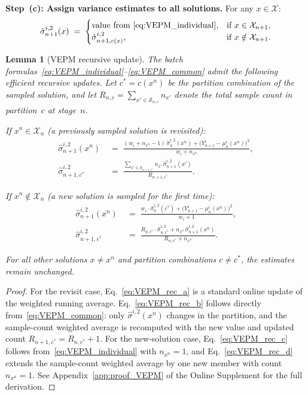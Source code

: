 \documentclass[12pt]{article}
\theoremstyle{plain}
\newtheorem{lemma}{Lemma}[section]
\theoremstyle{definition}
\theoremstyle{remark}
\begin{document}
\medskip
\noindent\textbf{Step~(c): Assign variance estimates to all solutions.} For any $x \in \mathcal{X}$:
\begin{equation}\label{eq:VEPM_assign}
  \hat{\sigma}^{i,2}_{n+1}(x) \;=\;
  \begin{cases}
    \text{value from \eqref{eq:VEPM_individual}}, & \text{if } x \in \mathcal{X}_{n+1}, \\
    \hat{\sigma}^{i,2}_{n+1,c(x)}, & \text{if } x \notin \mathcal{X}_{n+1}.
  \end{cases}
\end{equation}

\begin{lemma}[VEPM recursive update]\label{lem:VEPM_recursive}
The batch formulas~\eqref{eq:VEPM_individual}--\eqref{eq:VEPM_common} admit the following efficient recursive updates. Let $c^* = c(x^n)$ be the partition combination of the sampled solution, and let $R_{n,c} = \sum_{x' \in \mathcal{S}_{n,c}} n_{x'}$ denote the total sample count in partition~$c$ at stage~$n$.

If $x^n \in \mathcal{X}_n$ (a previously sampled solution is revisited):
\begin{align}
  \hat{\sigma}^{i,2}_{n+1}(x^n) &\;=\; \frac{(w_i + n_{x^n} - 1)\,\hat{\sigma}^{i,2}_n(x^n) + \bigl(Y^i_{n+1} - \mu^i_n(x^n)\bigr)^2}{w_i + n_{x^n}}, \label{eq:VEPM_rec_a} \\
  \hat{\sigma}^{i,2}_{n+1,c^*} &\;=\; \frac{\displaystyle\sum_{x' \in \mathcal{S}_{n+1,c^*}} n_{x'}\, \hat{\sigma}^{i,2}_{n+1}(x')}{R_{n+1,c^*}}. \label{eq:VEPM_rec_b}
\end{align}

If $x^n \notin \mathcal{X}_n$ (a new solution is sampled for the first time):
\begin{align}
  \hat{\sigma}^{i,2}_{n+1}(x^n) &\;=\; \frac{w_i \cdot \hat{\sigma}^{i,2}_0(c^*) + \bigl(Y^i_{n+1} - \mu^i_n(x^n)\bigr)^2}{w_i + 1}, \label{eq:VEPM_rec_c} \\
  \hat{\sigma}^{i,2}_{n+1,c^*} &\;=\; \frac{R_{n,c^*} \cdot \hat{\sigma}^{i,2}_{n,c^*} + n_{x^n}\, \hat{\sigma}^{i,2}_{n+1}(x^n)}{R_{n,c^*} + n_{x^n}}. \label{eq:VEPM_rec_d}
\end{align}

For all other solutions $x \neq x^n$ and partition combinations $c \neq c^*$, the estimates remain unchanged.
\end{lemma}

\begin{proof}
For the revisit case, Eq.~\eqref{eq:VEPM_rec_a} is a standard online update of the weighted running average.  Eq.~\eqref{eq:VEPM_rec_b} follows directly from~\eqref{eq:VEPM_common}: only $\hat{\sigma}^{i,2}(x^n)$ changes in the partition, and the sample-count weighted average is recomputed with the new value and updated count $R_{n+1,c^*} = R_{n,c^*} + 1$.  For the new-solution case, Eq.~\eqref{eq:VEPM_rec_c} follows from~\eqref{eq:VEPM_individual} with $n_{x^n} = 1$, and Eq.~\eqref{eq:VEPM_rec_d} extends the sample-count weighted average by one new member with count $n_{x^n} = 1$. See Appendix~\ref{app:proof_VEPM} of the Online Supplement for the full derivation.
\end{proof}
\end{document}
